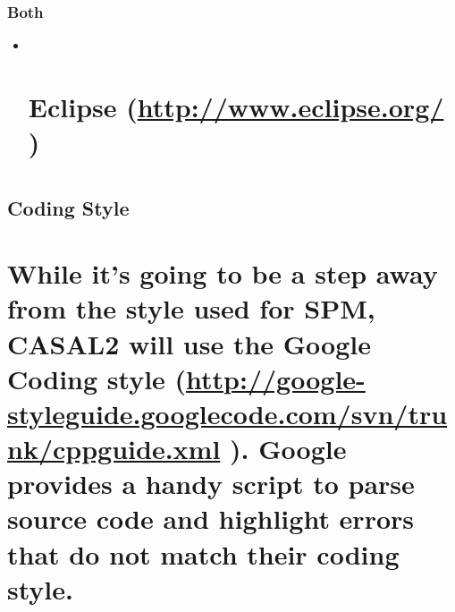 \documentclass[a4paper,11pt,twoside,pdftex,draft]{article}
\begin{document}
\hypertarget{both}{%
\subsubsection[Both]{\texorpdfstring{\protect\hypertarget{anchor-11}{}{}Both}{Both}}\label{both}}

\begin{itemize}
\item ~
  \hypertarget{eclipse-httpwww.eclipse.org}{%
  \section[Eclipse (\url{http://www.eclipse.org/}
  )]{\texorpdfstring{\protect\hypertarget{anchor-12}{}{}Eclipse
  (\url{http://www.eclipse.org/}
  )}{Eclipse (http://www.eclipse.org/ )}}\label{eclipse-httpwww.eclipse.org}}

  \hypertarget{section-2}{%
  \section{}\label{section-2}}
\end{itemize}

\hypertarget{coding-style}{%
\subsection[Coding
Style]{\texorpdfstring{\protect\hypertarget{anchor-13}{}{}Coding
Style}{Coding Style}}\label{coding-style}}

\hypertarget{while-its-going-to-be-a-step-away-from-the-style-used-for-spm-casal2-will-use-the-google-coding-style-httpgoogle-styleguide.googlecode.comsvntrunkcppguide.xml-.-google-provides-a-handy-script-to-parse-source-code-and-highlight-errors-that-do-not-match-their-coding-style.}{%
\section{\texorpdfstring{While it's going to be a step away from the
style used for SPM, CASAL2 will use the Google Coding style
(\url{http://google-styleguide.googlecode.com/svn/trunk/cppguide.xml} ).
Google provides a handy script to parse source code and highlight errors
that do not match their coding
style.}{While it's going to be a step away from the style used for SPM, CASAL2 will use the Google Coding style (http://google-styleguide.googlecode.com/svn/trunk/cppguide.xml ). Google provides a handy script to parse source code and highlight errors that do not match their coding style.}}\label{while-its-going-to-be-a-step-away-from-the-style-used-for-spm-casal2-will-use-the-google-coding-style-httpgoogle-styleguide.googlecode.comsvntrunkcppguide.xml-.-google-provides-a-handy-script-to-parse-source-code-and-highlight-errors-that-do-not-match-their-coding-style.}}
\end{document}
